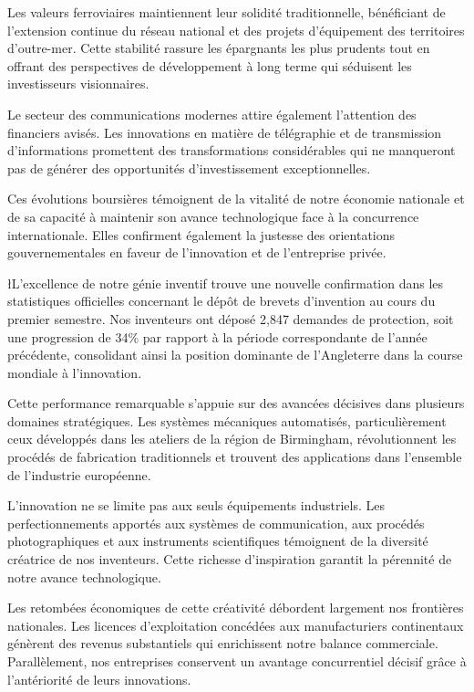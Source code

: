 \documentclass{news}
\begin{document}
Les valeurs ferroviaires maintiennent leur solidité traditionnelle, bénéficiant de l'extension continue du réseau national et des projets d'équipement des territoires d'outre-mer. Cette stabilité rassure les épargnants les plus prudents tout en offrant des perspectives de développement à long terme qui séduisent les investisseurs visionnaires.

Le secteur des communications modernes attire également l'attention des financiers avisés. Les innovations en matière de télégraphie et de transmission d'informations promettent des transformations considérables qui ne manqueront pas de générer des opportunités d'investissement exceptionnelles.

Ces évolutions boursières témoignent de la vitalité de notre économie nationale et de sa capacité à maintenir son avance technologique face à la concurrence internationale. Elles confirment également la justesse des orientations gouvernementales en faveur de l'innovation et de l'entreprise privée.

\l{L}'excellence de notre génie inventif trouve une nouvelle confirmation dans les statistiques officielles concernant le dépôt de brevets d'invention au cours du premier semestre. Nos inventeurs ont déposé 2,847 demandes de protection, soit une progression de 34\% par rapport à la période correspondante de l'année précédente, consolidant ainsi la position dominante de l'Angleterre dans la course mondiale à l'innovation.

Cette performance remarquable s'appuie sur des avancées décisives dans plusieurs domaines stratégiques. Les systèmes mécaniques automatisés, particulièrement ceux développés dans les ateliers de la région de Birmingham, révolutionnent les procédés de fabrication traditionnels et trouvent des applications dans l'ensemble de l'industrie européenne.

L'innovation ne se limite pas aux seuls équipements industriels. Les perfectionnements apportés aux systèmes de communication, aux procédés photographiques et aux instruments scientifiques témoignent de la diversité créatrice de nos inventeurs. Cette richesse d'inspiration garantit la pérennité de notre avance technologique.

Les retombées économiques de cette créativité débordent largement nos frontières nationales. Les licences d'exploitation concédées aux manufacturiers continentaux génèrent des revenus substantiels qui enrichissent notre balance commerciale. Parallèlement, nos entreprises conservent un avantage concurrentiel décisif grâce à l'antériorité de leurs innovations.
\end{document}
